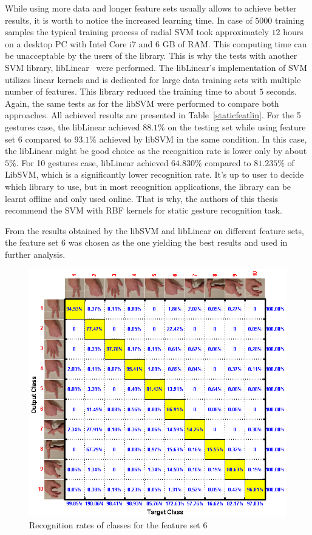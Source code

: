 While using more data and longer feature sets usually allows to achieve better results, it is worth to notice the increased learning time. 
In case of $5000$ training samples the typical training process of radial SVM took approximately $12$ hours on a desktop PC with Intel Core i7 and 6 GB of RAM. 
This computing time can be unacceptable by the users of the library. 
This is why the tests with another SVM library, libLinear~\cite{libLinear} were performed. 
The libLinear's implementation of SVM utilizes linear kernels and is dedicated for large data training sets with multiple number of features. 
This library reduced the training time to about $5$ seconds.
Again, the same tests as for the libSVM were performed to compare both approaches.
All achieved results are presented in Table~\ref{staticfeatlin}.
For the 5 gestures case, the libLinear achieved $88.1\%$ on the testing set while using feature set 6 compared to $93.1\%$ achieved by libSVM in the same condition.
In this case, the libLinear might be good choice as the recognition rate is lower only by about $5\%$.
For 10 gestures case, libLinear achieved $64.830\%$ compared to $81.235\%$ of LibSVM, which is a significantly lower recognition rate.
It's up to user to decide which library to use, but in most recognition applications, the library can be learnt offline and only used online.
That is why, the authors of this thesis recommend the SVM with RBF kernels for static gesture recognition task.

From the results obtained by the libSVM and libLinear on different feature sets, the feature set $6$ was chosen as the one yielding the best results and used in further analysis.

\begin{figure}[htb]
\centering
 \includegraphics[width=0.8\columnwidth]{figures/staticClassesRecognitionRates.png}
 \caption{Recognition rates of classes for the feature set $6$}
 \label{staticClassesRecognitionRates}
\end{figure}

